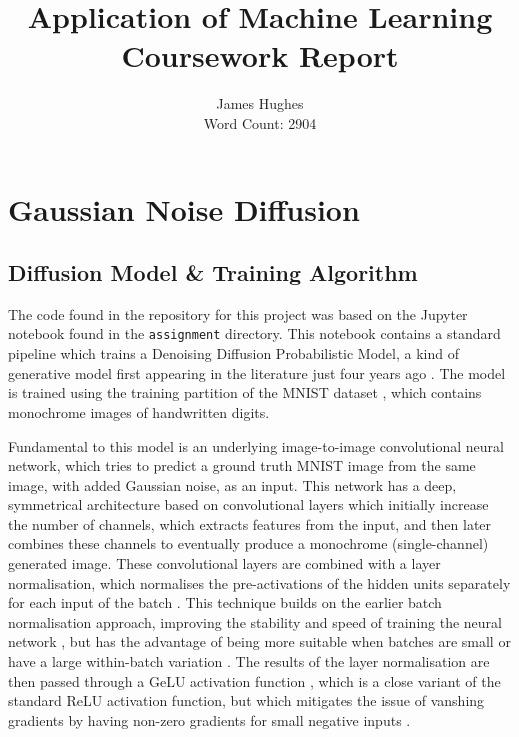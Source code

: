 \documentclass[12pt]{article}
\title{Application of Machine Learning Coursework Report}
\author{James Hughes \\ Word Count: 2904}
\begin{document}
\maketitle

\newpage

\tableofcontents

\newpage

\section{Gaussian Noise Diffusion}
\subsection{Diffusion Model \& Training Algorithm}
The code found in the repository for this project was based on the Jupyter notebook found in the \texttt{assignment} directory.
This notebook contains a standard pipeline which trains a Denoising Diffusion Probabilistic Model,
a kind of generative model first appearing in the literature just four years ago \cite{ho2020denoising}.
The model is trained using the training partition of the MNIST dataset \cite{mnist}, which contains monochrome images of handwritten digits.

Fundamental to this model is an underlying image-to-image convolutional neural network,
which tries to predict a ground truth MNIST image from the same image, with added Gaussian noise, as an input.
This network has a deep, symmetrical architecture based on convolutional layers which initially increase the number of channels,
which extracts features from the input, and then later combines these channels to eventually produce a monochrome (single-channel) generated image.
These convolutional layers are combined with a layer normalisation,
which normalises the pre-activations of the hidden units separately for each input of the batch \cite{ba2016layer}.
This technique builds on the earlier batch normalisation approach, improving the stability and speed of training the neural network \cite{ba2016layer},
but has the advantage of being more suitable when batches are small or have a large within-batch variation \cite{prince2023understanding}.
The results of the layer normalisation are then passed through a GeLU activation function \cite{hendrycks2023gaussian},
which is a close variant of the standard ReLU activation function,
but which mitigates the issue of vanshing gradients by having non-zero gradients for small negative inputs \cite{nguyen2021analysis}.
\end{document}
